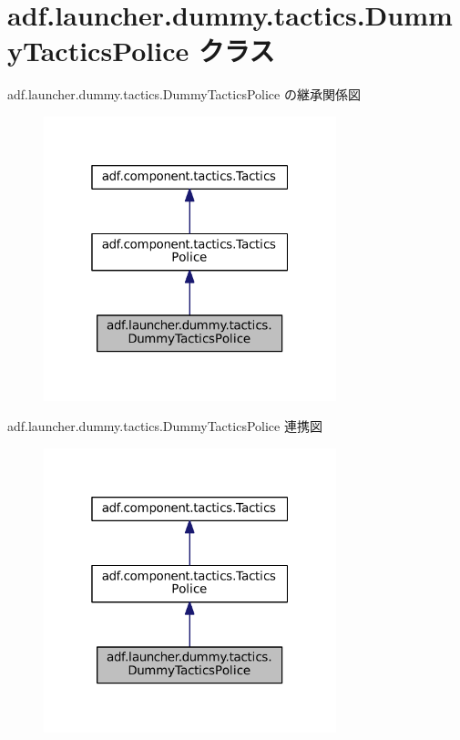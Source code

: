 \hypertarget{classadf_1_1launcher_1_1dummy_1_1tactics_1_1DummyTacticsPolice}{}\section{adf.\+launcher.\+dummy.\+tactics.\+Dummy\+Tactics\+Police クラス}
\label{classadf_1_1launcher_1_1dummy_1_1tactics_1_1DummyTacticsPolice}


adf.\+launcher.\+dummy.\+tactics.\+Dummy\+Tactics\+Police の継承関係図
\nopagebreak
\begin{figure}[H]
\begin{center}
\leavevmode
\includegraphics[width=241pt]{classadf_1_1launcher_1_1dummy_1_1tactics_1_1DummyTacticsPolice__inherit__graph}
\end{center}
\end{figure}


adf.\+launcher.\+dummy.\+tactics.\+Dummy\+Tactics\+Police 連携図
\nopagebreak
\begin{figure}[H]
\begin{center}
\leavevmode
\includegraphics[width=241pt]{classadf_1_1launcher_1_1dummy_1_1tactics_1_1DummyTacticsPolice__coll__graph}
\end{center}
\end{figure}
